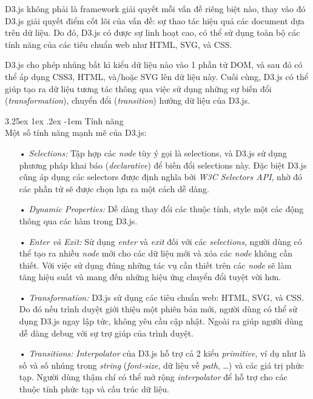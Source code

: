 \documentclass[12pt,a4paper]{article}
\makeatletter
\newcommand{\myparagraph}[1]{\paragraph{#1}\mbox{}\\} %
\renewcommand\paragraph{\@startsection{paragraph}{5}{\z@}%
  {3.25ex \@plus1ex \@minus.2ex}%
  {-1em}%
  {\normalfont\normalsize\bfseries}}
\makeatother
\begin{document}
D3.js không phải là framework giải quyết mỗi vấn đề riêng biệt nào, thay vào đó D3.js giải quyết điểm cốt lõi của vấn đề: sự thao tác hiệu quả các document dựa trên dữ liệu. Do đó, D3.js có được sự linh hoạt cao, có thể sử dụng toàn bộ các tính năng của các tiêu chuẩn web như HTML, SVG, và CSS.

D3.js cho phép nhúng bất kì kiểu dữ liệu nào vào 1 phần tử DOM, và sau đó có thể áp dụng CSS3, HTML, và/hoặc SVG lên dữ liệu này. Cuối cùng, D3.js có thể giúp tạo ra dữ liệu tương tác thông qua việc sử dụng những sự biến đổi (\textit{transformation}), chuyển đổi (\textit{transition}) hướng dữ liệu của D3.js.

\myparagraph{Tính năng}
Một số tính năng mạnh mẽ của D3.js:
\begin{itemize}
\item[•] \emph{Selections:} Tập hợp các \textit{node} tùy ý gọi là selections, và D3.js sử dụng phương pháp khai báo (\textit{declarative}) để biến đổi selections này. Đặc biệt D3.js cũng áp dụng các selectors được định nghĩa bởi \textit{W3C Selectors API}, nhờ đó các phần tử sẽ được chọn lựa ra một cách dễ dàng.
\item[•] \emph{Dynamic Properties:} Dễ dàng thay đổi các thuộc tính, style một các động thông qua các hàm trong D3.js.
\item[•] \emph{Enter và Exit:} Sử dụng \textit{enter} và \textit{exit} đối với các \textit{selections}, người dùng có thể tạo ra nhiều \textit{node} mới cho các dữ liệu mới và xóa các \textit{node} không cần thiết. Với việc sử dụng đúng những tác vụ cần thiết trên các \textit{node} sẽ làm tăng hiệu suất và mang đến những hiệu ứng chuyển đổi tuyệt vời hơn.
\item[•] \emph{Transformation:} D3.js sử dụng các tiêu chuẩn web: HTML, SVG, và CSS. Do đó nếu trình duyệt giới thiệu một phiên bản mới, người dùng có thể sử dụng D3.js ngay lập tức, không yêu cầu cập nhật. Ngoài ra giúp người dùng dễ dàng debug với sự trợ giúp của trình duyệt.
\item[•] \emph{Transitions:} \textit{Interpolator} của D3.js hỗ trợ cả 2 kiểu \textit{primitive}, ví dụ như là số và số nhúng trong \textit{string} (\textit{font-size}, dữ liệu về \textit{path}, …) và các giá trị phức tạp. Người dùng thậm chí có thể mở rộng \textit{interpolator} để hỗ trợ cho các thuộc tính phức tạp và cấu trúc dữ liệu.
\end{itemize}
\end{document}
